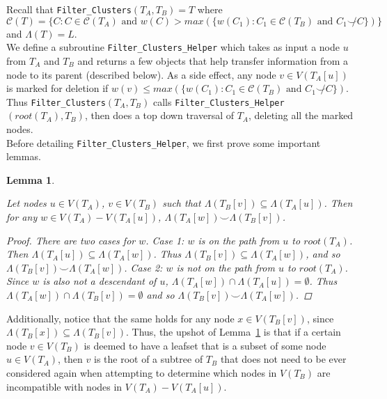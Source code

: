 \documentclass{article}
\newcommand{\compatible}{\smile}
\newcommand{\leafset}{\Lambda}
\newtheorem{filterclusterssubsetcompatible}[incompatibility]{Lemma}
\begin{document}
    Recall that \texttt{Filter\_Clusters}$(T_A, T_B) = T$ where $\mathcal{C}(T) = \{C : C \in \mathcal{C}(T_A) \text{ and } w(C) > max(\{w(C_1) : C_1 \in \mathcal{C}(T_B) \text{ and } C_1 \not\compatible C\})\}$ and $\leafset(T) = L$.\\

    We define a subroutine \texttt{Filter\_Clusters\_Helper} which takes as input a node $u$ from $T_A$ and $T_B$ and returns a few objects that help transfer information from a node to its parent (described below). As a side effect, any node $v \in V(T_A[u])$ is marked for deletion if $w(v) \leq max(\{w(C_1) : C_1 \in \mathcal{C}(T_B) \text{ and } C_1 \not\compatible C\})$. Thus \texttt{Filter\_Clusters}$(T_A, T_B)$ calls \texttt{Filter\_Clusters\_Helper}$(root(T_A), T_B)$, then does a top down traversal of $T_A$, deleting all the marked nodes.\\

    Before detailing \texttt{Filter\_Clusters\_Helper}, we first prove some important lemmas.

    \begin{filterclusterssubsetcompatible}
        \label{lem:filterclusterssubsetcompatible}

        Let nodes $u \in V(T_A)$, $v \in V(T_B)$ such that $\leafset(T_B[v]) \subseteq \leafset(T_A[u])$. Then for any $w \in V(T_A) - V(T_A[u])$, $\leafset(T_A[w]) \compatible \leafset(T_B[v])$.

        \begin{proof}
            There are two cases for $w$. Case 1: $w$ is on the path from $u$ to $root(T_A)$. Then $\leafset(T_A[u]) \subseteq \leafset(T_A[w])$. Thus $\leafset(T_B[v]) \subseteq \leafset(T_A[w])$, and so $\leafset(T_B[v]) \compatible \leafset(T_A[w])$. Case 2: $w$ is not on the path from $u$ to $root(T_A)$. Since $w$ is also not a descendant of $u$, $\leafset(T_A[w]) \cap \leafset(T_A[u]) = \emptyset$. Thus $\leafset(T_A[w]) \cap \leafset(T_B[v]) = \emptyset$ and so $\leafset(T_B[v]) \compatible \leafset(T_A[w])$.
        \end{proof}
    \end{filterclusterssubsetcompatible}

    Additionally, notice that the same holds for any node $x \in V(T_B[v])$, since $\leafset(T_B[x]) \subseteq \leafset(T_B[v])$. Thus, the upshot of Lemma~\ref{lem:filterclusterssubsetcompatible} is that if a certain node $v \in V(T_B)$ is deemed to have a leafset that is a subset of some node $u \in V(T_A)$, then $v$ is the root of a subtree of $T_B$ that does not need to be ever considered again when attempting to determine which nodes in $V(T_B)$ are incompatible with nodes in $V(T_A) - V(T_A[u])$.
\end{document}
